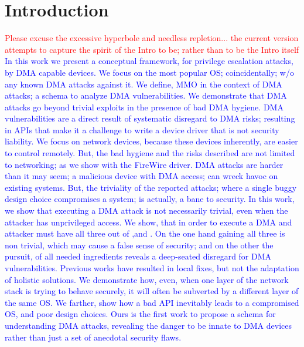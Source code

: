 \section{Introduction}
\textcolor{red}{Please excuse the excessive hyperbole and needless repletion... the current version attempts to capture the spirit 
of the Intro to be; rather than to be the Intro itself }
\textcolor{blue}{
In this work we present a conceptual framework, for privilege escalation attacks, by DMA capable devices.
We focus on the most popular OS; coincidentally; w/o any known DMA attacks against it. We define, MMO in the context of DMA attacks; a schema to analyze DMA vulnerabilities. We demonstrate that DMA attacks go beyond trivial exploits in the presence of bad DMA hygiene. DMA vulnerabilities are a direct result of systematic disregard to DMA risks; resulting in APIs that make it a challenge to write a device driver that is not security liability. We focus on network devices, because these devices inherently, are easier to control remotely. But, the bad hygiene and the risks described are not limited to networking; as we show with the FireWire driver. DMA attacks are harder than it may seem; a malicious device with DMA access; can wreck havoc on existing systems. But, the triviality of the reported attacks; where a single buggy design choice compromises a system; is actually, a bane to security. In this work, we show that executing a DMA attack is not necessarily trivial, even when the attacker has unprivileged access. We show, that in order to execute a DMA and attacker must have all three out of \means,\motivation and \oportunity. On the one hand gaining all three is non trivial, which may cause a false sense of security; and on the other the pursuit, of all needed ingredients reveals a deep-seated disregard for DMA vulnerabilities. Previous works have resulted in local fixes, but not the adaptation of holistic solutions. We demonstrate how, even, when one layer of the network stack is trying to behave securely, it will often be subverted by a different layer of the same OS. We farther, show how a bad API inevitably leads to a compromised OS, and poor design choices. Ours is the first work to propose a schema for understanding DMA attacks, revealing the danger to be innate to DMA devices rather than just a set of anecdotal security flaws.}